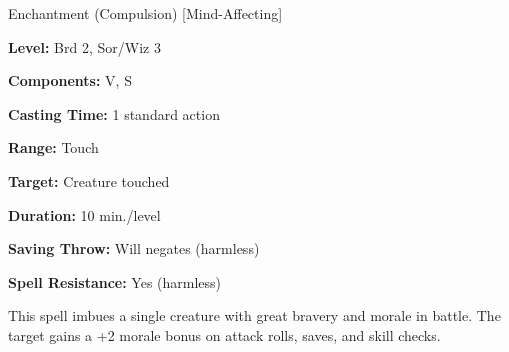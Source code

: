 
Enchantment (Compulsion) [Mind-Affecting]

\textbf{Level:} Brd 2, Sor/Wiz 3

\textbf{Components:} V, S

\textbf{Casting Time:} 1 standard action

\textbf{Range:} Touch

\textbf{Target:} Creature touched

\textbf{Duration:} 10 min./level

\textbf{Saving Throw:} Will negates (harmless)

\textbf{Spell Resistance:} Yes (harmless)

This spell imbues a single creature with great bravery and morale in battle. The 
target gains a +2 morale bonus on attack rolls, saves, and skill checks.

